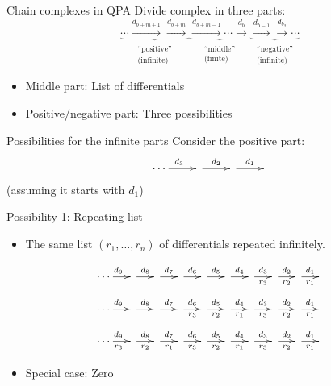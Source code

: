 \begin{frame}{Chain complexes in QPA}
Divide complex in three parts:
{\large
\[
\underbrace{
  \cdots \xrightarrow{d_{b+m+1}}
  \xrightarrow{d_{b+m}}
}_{\begin{array}{c}
   \text{``positive''} \\ \text{(infinite)}
   \end{array}}
\underbrace{
  \xrightarrow{d_{b+m-1}} \cdots
  \xrightarrow{d_b}
}_{\begin{array}{c}
   \text{``middle''} \\ \text{(finite)}
   \end{array}}
\underbrace{
  \xrightarrow{d_{b-1}} \xrightarrow{d_{b_2}}
  \cdots
}_{\begin{array}{c}
   \text{``negative''} \\ \text{(infinite)}
   \end{array}}
\]
}
\pause
\begin{itemize}
\item Middle part: List of differentials
\item Positive/negative part: Three possibilities
\end{itemize}
\end{frame}

\begin{frame}{Possibilities for the infinite parts}
Consider the positive part:
\[
\xymatrix{
\cdots
\ar[r]^{d_3} &
\ar[r]^{d_2} &
\ar[r]^{d_1} &
}
\]
(assuming it starts with $d_1$)
\end{frame}

\begin{frame}{Possibility 1: Repeating list}
\begin{itemize}
\item The same list $(r_1, \ldots, r_n)$ of differentials repeated
infinitely.
\end{itemize}
\vspace{1em}
\begin{overprint}
\[
\xymatrix@C=1.5em{
\cdots
\ar[r]^{d_9} &
\ar[r]^{d_8} &
\ar[r]^{d_7} &
\ar[r]^{d_6} &
\ar[r]^{d_5} &
\ar[r]^{d_4} &
\ar[r]^{d_3}_{r_3} &
\ar[r]^{d_2}_{r_2} &
\ar[r]^{d_1}_{r_1} &
}
\]
\[
\xymatrix@C=1.5em{
\cdots
\ar[r]^{d_9} &
\ar[r]^{d_8} &
\ar[r]^{d_7} &
\ar[r]^{d_6}_{r_3} &
\ar[r]^{d_5}_{r_2} &
\ar[r]^{d_4}_{r_1} &
\ar[r]^{d_3}_{r_3} &
\ar[r]^{d_2}_{r_2} &
\ar[r]^{d_1}_{r_1} &
}
\]
\[
\xymatrix@C=1.5em{
\cdots
\ar[r]^{d_9}_{r_3} &
\ar[r]^{d_8}_{r_2} &
\ar[r]^{d_7}_{r_1} &
\ar[r]^{d_6}_{r_3} &
\ar[r]^{d_5}_{r_2} &
\ar[r]^{d_4}_{r_1} &
\ar[r]^{d_3}_{r_3} &
\ar[r]^{d_2}_{r_2} &
\ar[r]^{d_1}_{r_1} &
}
\]
\end{overprint}
\begin{itemize}
\item Special case: Zero
\end{itemize}
\end{frame}

